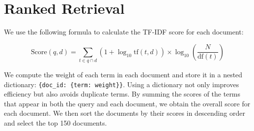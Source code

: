 \section{Ranked Retrieval}

We use the following formula to calculate the TF-IDF score for each document:

\[
\text{Score}(q,d) = \sum_{t \in q \cap d} \left( 1 + \log_{10} \text{tf}(t, d) \right) \times \log_{10} \left( \frac{N}{\text{df}(t)} \right)
\]

We compute the weight of each term in each document and store it in a nested dictionary: \texttt{\{doc\_id: \{term: weight\}\}}. Using a dictionary not only improves efficiency but also avoids duplicate terms. By summing the scores of the terms that appear in both the query and each document, we obtain the overall score for each document. We then sort the documents by their scores in descending order and select the top 150 documents.

